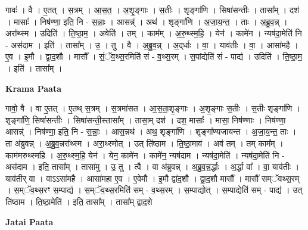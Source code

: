 \documentclass[17pt]{extarticle}
\begin{document}
गावः॑ । वै । ए॒तत् । स॒त्रम् । आ॒स॒त॒ । अ॒शृ॒ङ्गाः । स॒तीः । शृङ्गा॑णि । सिषा॑सन्तीः । तासा᳚म् । दश॑ । मासाः᳚ । निष॑ण्णा॒ इति॒ नि - स॒न्नाः॒ । आसन्न्॑ । अथ॑ । शृङ्गा॑णि । अ॒जा॒य॒न्त॒ । ताः । अ॒ब्रु॒व॒न्न् । अरा᳚थ्स्म । उदिति॑ । ति॒ष्ठा॒म॒ । अवेति॑ । तम् । काम᳚म् । अ॒रु॒थ्स्म॒हि॒ । येन॑ । कामे॑न । न्यष॑दा॒मेति॑ नि - अस॑दाम । इति॑ । तासा᳚म् । उ॒ । तु । वै । अ॒ब्रु॒व॒न्न् । अ॒द्‌र्धाः । वा॒ । याव॑तीः । वा॒ । आसा॑महै । ए॒व । इ॒मौ । द्वा॒द॒शौ । मासौ᳚ । सं॒ॅव॒थ्स॒रमिति॑ सं - व॒थ्स॒रम् । स॒पांद्येति॑ सं - पाद्य॑ । उदिति॑ । ति॒ष्ठा॒म॒ । इति॑ । तासा᳚म् ।  \newline


\textbf{Krama Paata} \newline

गावो॒ वै । वा ए॒तत् । ए॒तथ् स॒त्रम् । स॒त्रमा॑सत । आ॒स॒ता॒शृ॒ङ्‍गाः । अ॒शृ॒ङ्‍गाः स॒तीः । स॒तीः शृङ्‍गा॑णि । शृङ्‍गा॑णि॒ सिषा॑सन्तीः । सिषा॑सन्ती॒स्तासा᳚म् । तासा॒म् दश॑ । दश॒ मासाः᳚ । मासा॒ निष॑ण्णाः । निष॑ण्णा॒ आसन्न्॑ । निष॑ण्णा॒ इति॒ नि - स॒न्नाः॒ । आस॒न्नथ॑ । अथ॒ शृङ्‍गा॑णि । शृङ्‍गा᳚ण्यजायन्त । अ॒जा॒य॒न्त॒ ताः । ता अ॑ब्रुवन्न् । अ॒ब्रु॒व॒न्नरा᳚थ्स्म । अरा॒थ्स्मोत् । उत् ति॑ष्ठाम । ति॒ष्ठा॒माव॑ । अव॑ तम् । तम् काम᳚म् । काम॑मरुथ्स्महि । अ॒रु॒थ्स्म॒हि॒ येन॑ । येन॒ कामे॑न । कामे॑न॒ न्यष॑दाम । न्यष॑दा॒मेति॑ । न्यष॑दा॒मेति॑ नि - अस॑दाम । इति॒ तासा᳚म् । तासा॑मु । उ॒ तु । त्वै । वा अ॑ब्रुवन्न् । अ॒ब्रु॒व॒न्न॒र्द्धाः । अ॒र्द्धा वा᳚ । वा॒ याव॑तीः । याव॑तीर् वा । वाऽऽसा॑महै । आसा॑महा ए॒व । ए॒वेमौ । इ॒मौ द्वा॑द॒शौ । द्वा॒द॒शौ मासौ᳚ । मासौ॑ सम्ॅवथ्स॒रम् । स॒म्ॅव॒थ्स॒रꣳ स॒म्पाद्य॑ । स॒म्ॅव॒थ्स॒रमिति॑ सम् - व॒थ्स॒रम् । स॒म्पाद्योत् । स॒म्पाद्येति॑ सम् - पाद्य॑ । उत् ति॑ष्ठाम । ति॒ष्ठा॒मेति॑ । इति॒ तासा᳚म् । तासा᳚म् द्वाद॒शे \newline

\textbf{Jatai Paata} \newline
\end{document}
